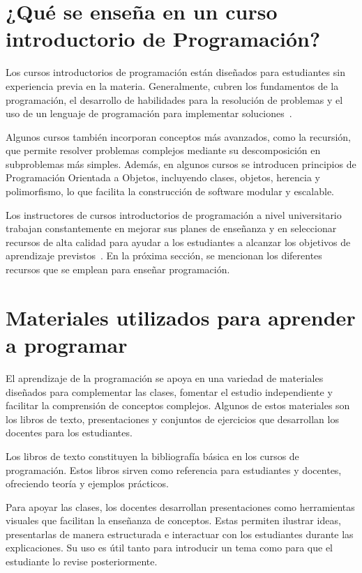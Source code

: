 \documentclass{article}
\begin{document}
\section{¿Qué se enseña en un curso introductorio de Programación?}\label{sec:contents}

Los cursos introductorios de programación están diseñados para estudiantes sin experiencia previa en la materia. Generalmente, cubren los fundamentos de la programación, el desarrollo de habilidades para la resolución de problemas y el uso de un lenguaje de programación para implementar soluciones~\cite{Medeiros2019}.

Algunos cursos también incorporan conceptos más avanzados, como la recursión, que permite resolver problemas complejos mediante su descomposición en subproblemas más simples. Además, en algunos cursos se introducen principios de Programación Orientada a Objetos, incluyendo clases, objetos, herencia y polimorfismo, lo que facilita la construcción de software modular y escalable.

Los instructores de cursos introductorios de programación a nivel universitario trabajan constantemente en mejorar sus planes de enseñanza y en seleccionar recursos de alta calidad para ayudar a los estudiantes a alcanzar los objetivos de aprendizaje previstos~\cite{NAS2018}. En la próxima sección, se mencionan los diferentes recursos que se emplean para enseñar programación.

\section{Materiales utilizados para aprender a programar}\label{sec:resources}

El aprendizaje de la programación se apoya en una variedad de materiales diseñados para complementar las clases, fomentar el estudio independiente y facilitar la comprensión de conceptos complejos. Algunos de estos materiales son los libros de texto, presentaciones y conjuntos de ejercicios que desarrollan los docentes para los estudiantes.

Los libros de texto constituyen la bibliografía básica en los cursos de programación. Estos libros sirven como referencia para estudiantes y docentes, ofreciendo teoría y ejemplos prácticos.

Para apoyar las clases, los docentes desarrollan presentaciones como herramientas visuales que facilitan la enseñanza de conceptos. Estas permiten ilustrar ideas, presentarlas de manera estructurada e interactuar con los estudiantes durante las explicaciones. Su uso es útil tanto para introducir un tema como para que el estudiante lo revise posteriormente.  
\end{document}
